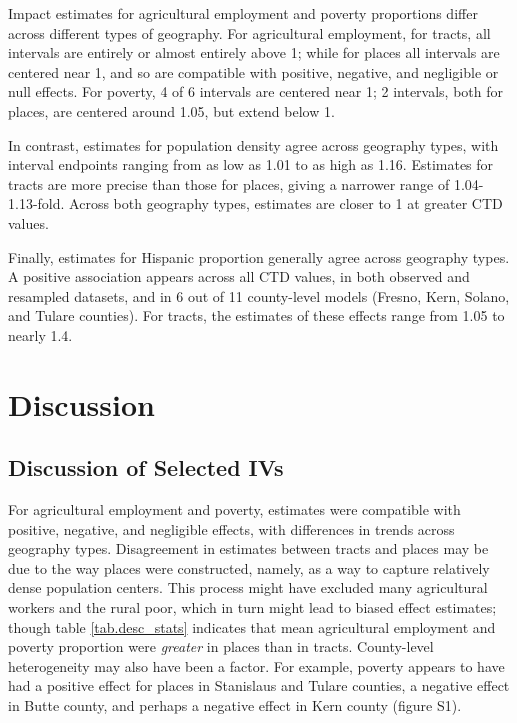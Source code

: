 \documentclass[ijerph,article,submit,oneauthor,pdftex]{Definitions/mdpi}
\begin{document}
Impact estimates for agricultural employment and poverty proportions differ across different types of geography. For agricultural employment, for tracts, all intervals are entirely or almost entirely above 1; while for places all intervals are centered near 1, and so are compatible with positive, negative, and negligible or null effects. For poverty, 4 of 6 intervals are centered near 1; 2 intervals, both for places, are centered around 1.05, but extend below 1.

In contrast, estimates for population density agree across geography types, with interval endpoints ranging from as low as 1.01 to as high as 1.16. Estimates for tracts are more precise than those for places, giving a narrower range of 1.04-1.13-fold. Across both geography types, estimates are closer to 1 at greater CTD values.

Finally, estimates for Hispanic proportion generally agree across geography types. A positive association appears across all CTD values, in both observed and resampled datasets, and in 6 out of 11 county-level models (Fresno, Kern, Solano, and Tulare counties). For tracts, the estimates of these effects range from 1.05 to nearly 1.4.

\hypertarget{discussion}{%
\section{Discussion}\label{discussion}}

\hypertarget{discussion-of-selected-ivs}{%
\subsection{Discussion of Selected IVs}\label{discussion-of-selected-ivs}}

For agricultural employment and poverty, estimates were compatible with positive, negative, and negligible effects, with differences in trends across geography types. Disagreement in estimates between tracts and places may be due to the way places were constructed, namely, as a way to capture relatively dense population centers. This process might have excluded many agricultural workers and the rural poor, which in turn might lead to biased effect estimates; though table \ref{tab.desc_stats} indicates that mean agricultural employment and poverty proportion were \emph{greater} in places than in tracts. County-level heterogeneity may also have been a factor. For example, poverty appears to have had a positive effect for places in Stanislaus and Tulare counties, a negative effect in Butte county, and perhaps a negative effect in Kern county (figure S1).
\end{document}
